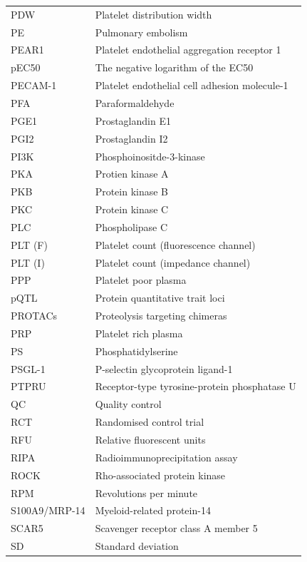 \documentclass[11pt,twoside]{bristolthesis}
\begin{document}
\begin{abbreviations}
\begin{longtable}[t]{ll}
    \addlinespace
    PDW & Platelet distribution width\\
    PE & Pulmonary embolism\\
    PEAR1 & Platelet endothelial aggregation receptor 1\\
    pEC50 & The negative logarithm of the EC50\\
    PECAM-1 & Platelet endothelial cell adhesion molecule-1\\
    \addlinespace
    PFA & Paraformaldehyde\\
    PGE1 & Prostaglandin E1\\
    PGI2 & Prostaglandin I2\\
    PI3K & Phosphoinositde-3-kinase\\
    PKA & Protien kinase A\\
    \addlinespace
    PKB & Protein kinase B\\
    PKC & Protein kinase C\\
    PLC & Phospholipase C\\
    PLT (F) & Platelet count (fluorescence channel)\\
    PLT (I) & Platelet count (impedance channel)\\
    \addlinespace
    PPP & Platelet poor plasma\\
    pQTL & Protein quantitative trait loci\\
    PROTACs & Proteolysis targeting chimeras\\
    PRP & Platelet rich plasma\\
    PS & Phosphatidylserine\\
    \addlinespace
    PSGL-1 & P-selectin glycoprotein ligand-1\\
    PTPRU & Receptor-type tyrosine-protein phosphatase U\\
    QC & Quality control\\
    RCT & Randomised control trial\\
    RFU & Relative fluorescent units\\
    \addlinespace
    RIPA & Radioimmunoprecipitation assay\\
    ROCK & Rho-associated protein kinase\\
    RPM & Revolutions per minute\\
    S100A9/MRP-14 & Myeloid-related protein-14\\
    SCAR5 & Scavenger receptor class A member 5\\
    \addlinespace
    SD & Standard deviation\\

\end{longtable}
\end{abbreviations}
\end{document}
